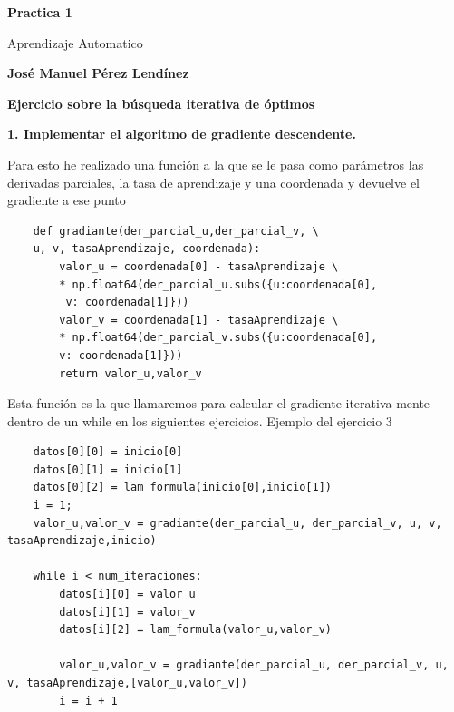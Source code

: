 \documentclass[titlepage]{article}
\begin{document}
	\begin{titlepage}
		\begin{center}
			\vspace*{1cm}
			\date{} %
			\Huge
			\textbf{Practica 1}
			
			\vspace{0.5cm}
			\LARGE
			Aprendizaje Automatico
			
			\vspace{1.5cm}
			
			\textbf{José Manuel Pérez Lendínez}
			

			
		\end{center}
	\end{titlepage}

 \newpage
 	\large
 	\textbf{Ejercicio sobre la búsqueda iterativa de óptimos}
 	\newline
 	
 	\textbf{1. Implementar el algoritmo de gradiente descendente.}
 	
 	\normalfont
 	\vspace{0.5cm}
 	
 	Para esto he realizado una función a la que se le pasa como parámetros las derivadas parciales, la tasa de aprendizaje y una coordenada y devuelve el gradiente a ese punto
	 
 	\begin{lstlisting}
 	def gradiante(der_parcial_u,der_parcial_v, \ 
 	u, v, tasaAprendizaje, coordenada):
 		valor_u = coordenada[0] - tasaAprendizaje \
 		* np.float64(der_parcial_u.subs({u:coordenada[0],
 		 v: coordenada[1]}))
 		valor_v = coordenada[1] - tasaAprendizaje \
 		* np.float64(der_parcial_v.subs({u:coordenada[0], 
 		v: coordenada[1]}))
 		return valor_u,valor_v
 	\end{lstlisting}
 	
 	Esta función es la que llamaremos para calcular el gradiente iterativa mente dentro de un while en los siguientes ejercicios.
 	Ejemplo del ejercicio 3
 	
 	\begin{lstlisting}
	datos[0][0] = inicio[0]
	datos[0][1] = inicio[1]
	datos[0][2] = lam_formula(inicio[0],inicio[1])
	i = 1;
	valor_u,valor_v = gradiante(der_parcial_u, der_parcial_v, u, v, tasaAprendizaje,inicio)
 		
 	while i < num_iteraciones:
		datos[i][0] = valor_u
		datos[i][1] = valor_v
		datos[i][2] = lam_formula(valor_u,valor_v)
 		
 		valor_u,valor_v = gradiante(der_parcial_u, der_parcial_v, u, v, tasaAprendizaje,[valor_u,valor_v])
 		i = i + 1
 		
 	\end{lstlisting}
 	
\end{document}
